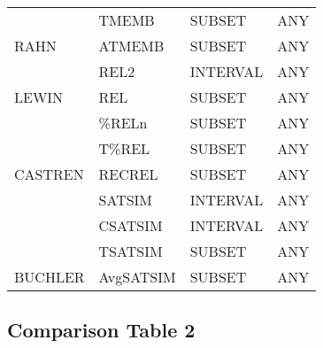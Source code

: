 \documentclass{article}
\begin{document}
\begin{table}[htb]
\begin{center}
\begin{tabular}{llll}
             &  TMEMB       &  SUBSET    &  ANY          \\
 RAHN        &  ATMEMB      &  SUBSET    &  ANY          \\
\hline
             &  REL2        &  INTERVAL  &  ANY          \\
 LEWIN       &  REL         &  SUBSET    &  ANY          \\
\hline
             &  \%RELn      &  SUBSET    &  ANY          \\
             &  T\%REL      &  SUBSET    &  ANY          \\
 CASTREN     &  RECREL      &  SUBSET    &  ANY          \\
\hline
             &  SATSIM      &  INTERVAL  &  ANY          \\
             &  CSATSIM     &  INTERVAL  &  ANY          \\
             &  TSATSIM     &  SUBSET    &  ANY          \\
 BUCHLER     &  AvgSATSIM   &  SUBSET    &  ANY          \\
\hline
\end{tabular}
\end{center}
\end{table}
\subsection{Comparison Table 2}
\label{sec-11-11}
\end{document}

